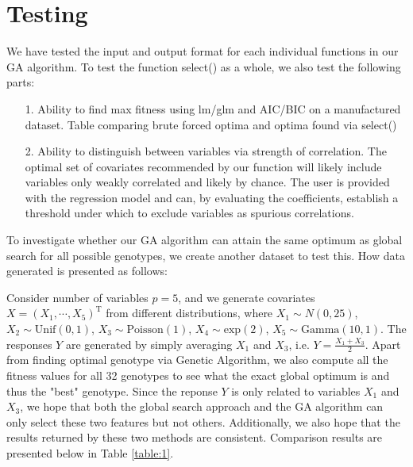 \documentclass{article}
\def\T{{ \mathrm{\scriptscriptstyle T} }}
\def\T{\mathrm{\scriptstyle T}} %
\begin{document}
\section{Testing}\label{s2}
We have tested the input and output format for each individual functions in our GA algorithm. To test the function select() as a whole, we also test the following parts:
\begin{itemize}
\item[1.] Ability to find max fitness using lm/glm and AIC/BIC on a manufactured dataset. Table comparing brute forced optima and optima found via select()\\
\item[2.] Ability to distinguish between variables via strength of correlation. The optimal set of covariates recommended by our function will likely include variables only weakly correlated and likely by chance. The user is provided with the regression model and can, by evaluating the coefficients, establish a threshold under which to exclude variables as spurious correlations.
\end{itemize}

\noindent
To investigate whether our GA algorithm can attain the same optimum as global search for all possible genotypes, we create another dataset to test this. How data generated is presented as follows:

\vspace{3mm}
\noindent
Consider number of variables $p=5$, and we generate covariates $X=(X_{1}, \cdots, X_{5})^{\T}$ from different distributions, where $X_{1}\sim N(0,25)$, $X_{2}\sim \mathrm{Unif}(0,1)$, $X_{3}\sim \mathrm{Poisson}(1)$, $X_{4}\sim \mathrm{exp}(2)$, $X_{5}\sim \mathrm{Gamma}(10,1)$. The responses $Y$ are generated by simply averaging $X_{1}$ and $X_{3}$, i.e. $Y=\frac{X_{1}+X_{3}}{2}$. Apart from finding optimal genotype via Genetic Algorithm, we also compute all the fitness values for all 32 genotypes to see what the exact global optimum is and thus the "best" genotype. Since the reponse $Y$ is only related to variables $X_{1}$ and $X_{3}$, we hope that both the global search approach and the GA algorithm can only select these two features but not others. Additionally, we also hope that the results returned by these two methods are consistent. Comparison results are presented below in Table \ref{table:1}.
\end{document}
